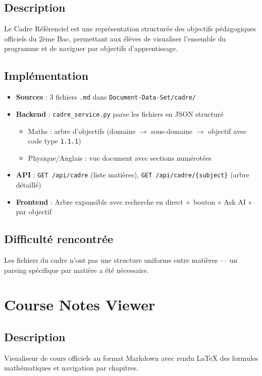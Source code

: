 \documentclass[12pt,a4paper]{report}
\begin{document}
\subsection{Description}
Le Cadre Référenciel est une représentation structurée des objectifs pédagogiques officiels du 2ème Bac, permettant aux élèves de visualiser l'ensemble du programme et de naviguer par objectifs d'apprentissage.

\subsection{Implémentation}
\begin{itemize}
    \item \textbf{Sources} : 3 fichiers \texttt{.md} dans \texttt{Document-Data-Set/cadre/}
    \item \textbf{Backend} : \texttt{cadre\_service.py} parse les fichiers en JSON structuré
    \begin{itemize}
        \item Maths : arbre d'objectifs (domaine $\rightarrow$ sous-domaine $\rightarrow$ objectif avec code type \texttt{1.1.1})
        \item Physique/Anglais : vue document avec sections numérotées
    \end{itemize}
    \item \textbf{API} : \texttt{GET /api/cadre} (liste matières), \texttt{GET /api/cadre/\{subject\}} (arbre détaillé)
    \item \textbf{Frontend} : Arbre expansible avec recherche en direct + bouton « Ask AI » par objectif
\end{itemize}

\subsection{Difficulté rencontrée}
Les fichiers du cadre n'ont pas une structure uniforme entre matières — un parsing spécifique par matière a été nécessaire.

\section{Course Notes Viewer}

\subsection{Description}
Visualiseur de cours officiels au format Markdown avec rendu LaTeX des formules mathématiques et navigation par chapitres.
\end{document}
